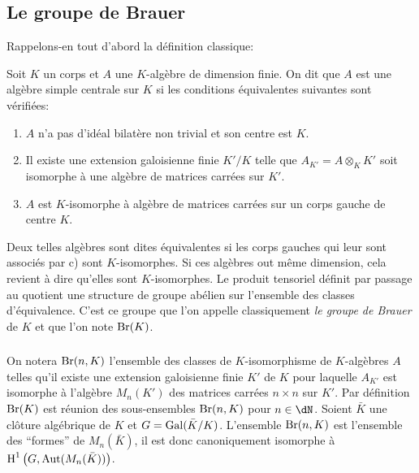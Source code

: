 \subsection{Le groupe de Brauer}\label{I:3-1}

Rappelons-en tout d'abord la définition classique:





\begin{definition}\label{I:3-1-1}
Soit $K$ un corps et $A$ une $K$-algèbre de dimension finie. On dit que $A$ 
est une algèbre simple centrale sur $K$ si les conditions équivalentes 
suivantes sont vérifiées:
\begin{enumerate}[\indent a)]
  \item $A$ n'a pas d'idéal bilatère non trivial et son centre est $K$. 
  \item Il existe une extension galoisienne finie $K'/K$ telle que 
    $A_{K'} = A\otimes_K K'$ soit isomorphe à une algèbre de matrices 
    carrées sur $K'$.
  \item $A$ est $K$-isomorphe à algèbre de matrices carrées sur un corps 
    gauche de centre $K$.
\end{enumerate}
\end{definition}

Deux telles algèbres sont dites équivalentes si les corps gauches qui 
leur sont associés par c) sont $K$-isomorphes. Si ces algèbres out 
même dimension, cela revient à dire qu'elles sont $K$-isomorphes. Le 
produit tensoriel définit par passage au quotient une structure de groupe 
abélien sur l'ensemble des classes d'équivalence. C'est ce groupe que l'on 
appelle classiquement \emph{le groupe de Brauer} de $K$ et que l'on note 
$\operatorname{Br}(K)$. 





\subsubsection{}\label{I:3-1-2}

On notera $\operatorname{Br}(n,K)$ l'ensemble des classes de $K$-isomorphisme de 
$K$-algèbres $A$ telles qu'il existe une extension galoisienne finie $K'$ de 
$K$ pour laquelle $A_{K'}$ est isomorphe à l'algèbre $M_n(K')$ des matrices 
carrées $n\times n$ sur $K'$. Par définition $\operatorname{Br}(K)$ est réunion des 
sous-ensembles $\operatorname{Br}(n,K)$ pour $n\in\dN$. Soient $\bar K$ une clôture 
algébrique de $K$ et $G=\operatorname{Gal}(\bar K/K)$. L'ensemble $\operatorname{Br}(n,K)$ est 
l'ensemble des ``formes'' de $M_n(\bar K)$, il est donc canoniquement 
isomorphe à $\operatorname{H}^1\left(G,\operatorname{Aut}(M_n(\bar K))\right)$. 

